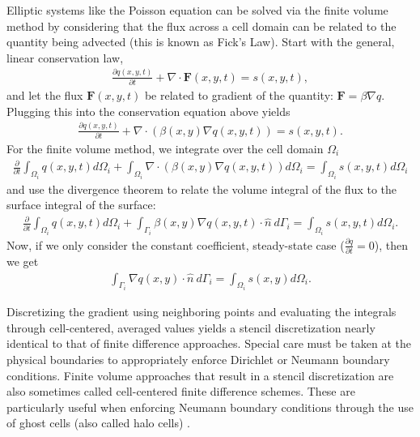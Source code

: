 Elliptic systems like the Poisson equation can be solved via the finite volume method by considering that the flux across a cell domain can be related to the quantity being advected (this is known as Fick's Law). Start with the general, linear conservation law,
\begin{align}
    \frac{\partial q(x,y,t)}{\partial t} + \nabla \cdot \textbf{F}(x,y,t) = s(x,y,t),
\end{align}
and let the flux $\textbf{F}(x,y,t)$ be related to gradient of the quantity: $\textbf{F} = \beta \nabla q$. Plugging this into the conservation equation above yields
\begin{align}
    \frac{\partial q(x,y,t)}{\partial t} + \nabla \cdot \left( \beta(x,y) \nabla q(x,y,t) \right) = s(x,y,t).
\end{align}
For the finite volume method, we integrate over the cell domain $\Omega_i$
\begin{align}
    \frac{\partial}{\partial t} \int_{\Omega_i} q(x,y,t) d\Omega_i + \int_{\Omega_i} \nabla \cdot \left( \beta(x,y) \nabla q(x,y,t) \right) d\Omega_i = \int_{\Omega_i} s(x,y,t) d\Omega_i
\end{align}
and use the divergence theorem to relate the volume integral of the flux to the surface integral of the surface:
\begin{align}
    \frac{\partial}{\partial t} \int_{\Omega_i} q(x,y,t) d\Omega_i + \int_{\Gamma_i} \beta(x,y) \nabla q(x,y,t) \cdot \hat{n}\ d\Gamma_i = \int_{\Omega_i} s(x,y,t) d\Omega_i.
\end{align}
Now, if we only consider the constant coefficient, steady-state case ($\frac{\partial q}{\partial t} = 0$), then we get
\begin{align}
    \int_{\Gamma_i} \nabla q(x,y) \cdot \hat{n}\ d\Gamma_i = \int_{\Omega_i} s(x,y) d\Omega_i.
\end{align}

Discretizing the gradient using neighboring points and evaluating the integrals through cell-centered, averaged values yields a stencil discretization nearly identical to that of finite difference approaches. Special care must be taken at the physical boundaries to appropriately enforce Dirichlet or Neumann boundary conditions. Finite volume approaches that result in a stencil discretization are also sometimes called cell-centered finite difference schemes. These are particularly useful when enforcing Neumann boundary conditions through the use of ghost cells (also called halo cells) \citep{leveque2007finite}.

